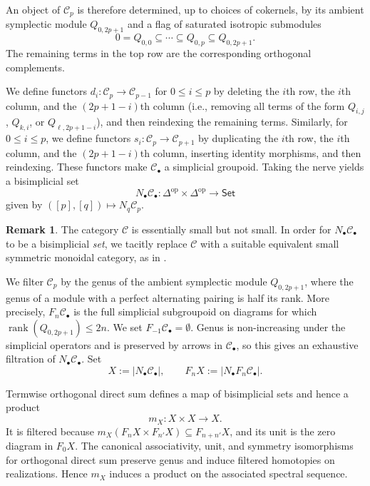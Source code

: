 \documentclass[12 pt]{amsart}
\newcommand{\cC}{\mathcal{C}}
\newcommand{\Set}{\mathsf{Set}}
\newcommand{\op}{\mathrm{op}}
\newcommand{\rank}{\operatorname{rank}}
\newcommand{\<}{\langle}
\renewcommand{\>}{\rangle}
\theoremstyle{definition}
\newtheorem{remark}[theorem]{Remark}
\begin{document}
An object of $\cC_p$ is therefore determined, up to choices of cokernels, by its ambient symplectic module $Q_{0, 2p + 1}$ and a flag of saturated isotropic submodules
\[
0 = Q_{0, 0} \subseteq \cdots \subseteq Q_{0, p} \subseteq Q_{0, 2p + 1}.
\]
The remaining terms in the top row are the corresponding orthogonal complements.

We define functors $d_i \colon \cC_p \to \cC_{p - 1}$ for $0 \leq i \leq p$ by deleting the $i$th row, the $i$th column, and the $(2p + 1 - i)$th column (i.e., removing all terms of the form $Q_{i, j}$, $Q_{k, i}$, or $Q_{\ell, 2p + 1 - i}$), and then reindexing the remaining terms. Similarly, for $0 \leq i \leq p$, we define functors $s_i \colon \cC_p \to \cC_{p + 1}$ by duplicating the $i$th row, the $i$th column, and the $(2p + 1 - i)$th column, inserting identity morphisms, and then reindexing. These functors make $\cC_\bullet$ a simplicial groupoid. Taking the nerve yields a bisimplicial set
\[
N_\bullet \cC_\bullet \colon \Delta^\op \times \Delta^\op \to \Set
\]
given by $([p], [q]) \mapsto N_q \cC_p$.
\begin{remark}\label{rem:symplectic-small-model}
The category $\cC$ is essentially small but not small. In order for $N_\bullet \cC_\bullet$ to be a bisimplicial \emph{set}, we tacitly replace $\cC$ with a suitable equivalent small symmetric monoidal category, as in \cite[Remark~2.13]{BCGP}.
\end{remark}

We filter $\cC_p$ by the genus of the ambient symplectic module $Q_{0, 2p + 1}$, where the genus of a module with a perfect alternating pairing is half its rank. More precisely, $F_n \cC_\bullet$ is the full simplicial subgroupoid on diagrams for which $\rank(Q_{0, 2p + 1}) \leq 2n$. We set $F_{-1} \cC_\bullet = \emptyset$. Genus is non-increasing under the simplicial operators and is preserved by arrows in $\cC_\bullet$, so this gives an exhaustive filtration of $N_\bullet \cC_\bullet$. Set
\[
X := |N_\bullet \cC_\bullet |, \qquad F_n X := |N_\bullet F_n \cC_\bullet |.
\]

Termwise orthogonal direct sum defines a map of bisimplicial sets and hence a product
\[
m_X \colon X \times X \longrightarrow X.
\]
It is filtered because $m_X(F_n X \times F_{n'} X) \subseteq F_{n + n'} X$, and its unit is the zero diagram in $F_0 X$. The canonical associativity, unit, and symmetry isomorphisms for orthogonal direct sum preserve genus and induce filtered homotopies on realizations. Hence $m_X$ induces a product on the associated spectral sequence.
\end{document}
